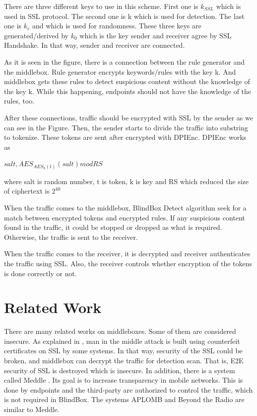 \documentclass{winslabreport}
\begin{document}
There are three different keys to use in this scheme. First one is $k_{SSL}$ which is used in SSL protocol. The second one is k which is used for detection. The last one is $k_r$ and which is used for randomness. These three keys are generated/derived by $k_0$ which is the key sender and receiver agree by SSL Handshake. In that way, sender and receiver are connected.

As it is seen in the figure, there is a connection between the rule generator and the middlebox. Rule generator encrypts keywords/rules with the key k. And middlebox gets these rules to detect suspicious content without the knowledge of the key k. While this happening, endpoints should not have the knowledge of the rules, too.

After these connections, traffic should be encrypted with SSL by the sender as we can see in the Figure. Then, the sender starts to divide the traffic into substring to tokenize. These tokens are sent after encrypted with DPIEnc. DPIEnc works as

\begin{center}
	$salt ,  AES_{AES_k (t)}(salt)  mod RS$
\end{center}

where salt is random number, t is token, k is key and  RS which reduced the size of ciphertext is $2^{40}$

When the traffic comes to the middlebox, BlindBox Detect algorithm seek for a match between encrypted tokens and encrypted rules. If any suspicious content found in the traffic, it could be stopped or dropped as what is required. Otherwise, the traffic is sent to the receiver.

When the traffic comes to the receiver, it is decrypted and receiver authenticates the traffic using SSL. Also, the receiver controls whether encryption of the tokens is done correctly or not. 

\section{Related Work}

There are many related works on middleboxes. Some of them are considered insecure. As explained in \cite{SSL}, man in the middle attack is built using counterfeit certificates on SSL by some systems. In that way, security of the SSL could be broken, and middlebox can decrypt the traffic for detection scan. That is, E2E security of SSL is destroyed which is insecure. In addition, there is a system called Meddle \cite{Traffic}. Its goal is to increase transparency in mobile networks. This is done by endpoints and the third-party are authorized to control the traffic, which is not required in BlindBox. The systems APLOMB \cite{Network} and Beyond the Radio \cite{48} are similar to Meddle.
\end{document}
